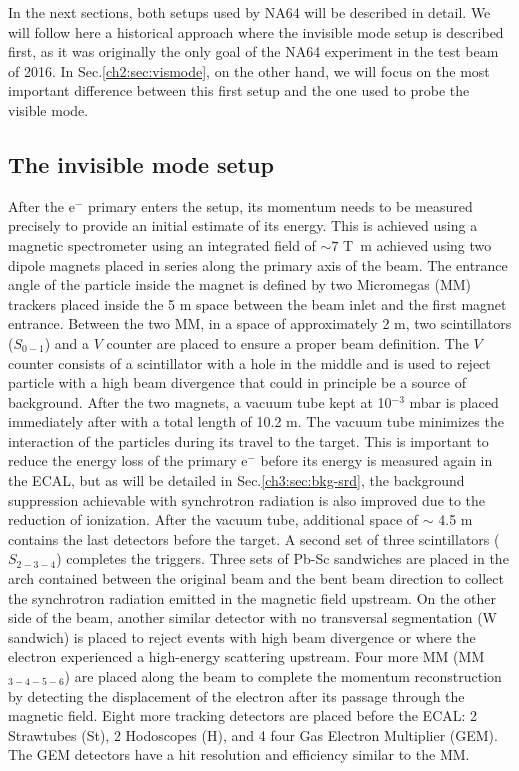 In the next sections, both setups used by NA64 will be described in detail. We will follow here a historical approach where the invisible mode setup is described first, as it was originally the only goal of the NA64 experiment in the test beam of 2016. In Sec.\ref{ch2:sec:vismode}, on the other hand, we will focus on the most important difference between this first setup and the one used to probe the visible mode.


\subsection{The invisible mode setup}
\label{ch2:sec:invismode}

After the e$^-$ primary enters the setup, its momentum needs to be measured precisely to provide an initial estimate of its energy. This is achieved using a magnetic spectrometer using an integrated field of $\sim 7$ \si{\tesla\meter} achieved using two dipole magnets \cite{mbpl} placed in series along the primary axis of the beam. The entrance angle of the particle inside the magnet is defined by two Micromegas (MM) trackers placed inside the 5 m space between the beam inlet and the first magnet entrance. Between the two MM, in a space of approximately 2 m, two scintillators ($S_{0-1}$) and a $V$ counter are placed to ensure a proper beam definition. The $V$ counter consists of a scintillator with a hole in the middle and is used to reject particle with a high beam divergence that could in principle be a source of background. After the two magnets, a vacuum tube kept at 10$^{-3}$ \si{mbar} is placed immediately after with a total length of 10.2 \si{m}. The vacuum tube minimizes the interaction of the particles during its travel to the target. This is important to reduce the energy loss of the primary e$^-$ before its energy is measured again in the ECAL, but as will be detailed in Sec.\ref{ch3:sec:bkg-srd}, the background suppression achievable with synchrotron radiation is also improved due to the reduction of ionization. After the vacuum tube, additional space of $\sim$ 4.5 \si{m} contains the last detectors before the target. A second set of three scintillators ($S_{2-3-4}$) completes the triggers. Three sets of Pb-Sc sandwiches are placed in the arch contained between the original beam and the bent beam direction to collect the synchrotron radiation emitted in the magnetic field upstream. On the other side of the beam, another similar detector with no transversal segmentation (W sandwich) is placed to reject events with high beam divergence or where the electron experienced a high-energy scattering upstream. Four more MM (MM$_{3-4-5-6}$) are placed along the beam to complete the momentum reconstruction by detecting the displacement of the electron after its passage through the magnetic field. Eight more tracking detectors are placed before the ECAL: 2 Strawtubes (St), 2 Hodoscopes (H), and 4 four Gas Electron Multiplier (GEM). The GEM detectors have a hit resolution and efficiency similar to the MM.
